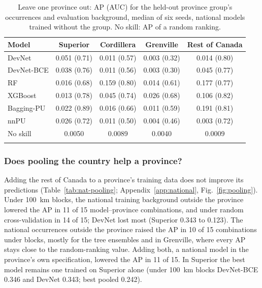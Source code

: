 \documentclass[pdflatex,sn-apa]{sn-jnl}
\begin{document}
\begin{table}[t]
\caption{Leave one province out: AP (AUC) for the held-out province group's occurrences and evaluation background, median of six seeds, national models trained without the group. No skill: AP of a random ranking.}\label{tab:nat-lopo}
\footnotesize
\setlength{\tabcolsep}{3pt}
\begin{tabular*}{\textwidth}{@{\extracolsep\fill}lcccc}
\toprule
Model & Superior & Cordillera & Grenville & Rest of Canada \\
\midrule
DevNet & 0.051 (0.71) & 0.011 (0.57) & 0.003 (0.32) & 0.014 (0.80) \\
DevNet-BCE & 0.038 (0.76) & 0.011 (0.56) & 0.003 (0.30) & 0.045 (0.77) \\
RF & 0.016 (0.68) & 0.159 (0.80) & 0.014 (0.61) & 0.177 (0.77) \\
XGBoost & 0.013 (0.78) & 0.045 (0.74) & 0.026 (0.68) & 0.106 (0.82) \\
Bagging-PU & 0.022 (0.89) & 0.016 (0.66) & 0.011 (0.59) & 0.191 (0.81) \\
nnPU & 0.026 (0.72) & 0.011 (0.50) & 0.004 (0.46) & 0.003 (0.72) \\
\midrule
No skill & 0.0050 & 0.0089 & 0.0040 & 0.0009 \\
\botrule
\end{tabular*}
\end{table}

\subsubsection{Does pooling the country help a province?}\label{sec:res-pooling}

Adding the rest of Canada to a province's training data does not improve its predictions (Table~\ref{tab:nat-pooling}; Appendix~\ref{app:national}, Fig.~\ref{fig:pooling}). Under 100~km blocks, the national training background outside the province lowered the AP in 11 of 15 model--province combinations, and under random cross-validation in 14 of 15; DevNet lost most (Superior 0.343 to 0.123). The national occurrences outside the province raised the AP in 10 of 15 combinations under blocks, mostly for the tree ensembles and in Grenville, where every AP stays close to the random-ranking value. Adding both, a national model in the province's own specification, lowered the AP in 11 of 15. In Superior the best model remains one trained on Superior alone (under 100~km blocks DevNet-BCE 0.346 and DevNet 0.343; best pooled 0.242).
\end{document}
